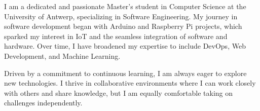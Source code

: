 

\begin{cvparagraph}

I am a dedicated and passionate Master's student in Computer Science at the University of Antwerp, specializing in Software Engineering. 
My journey in software development began with Arduino and Raspberry Pi projects, which sparked my interest in IoT and the seamless integration of software and hardware. Over time, I have broadened my expertise to include DevOps, Web Development, and Machine Learning.

Driven by a commitment to continuous learning, I am always eager to explore new technologies. 
I thrive in collaborative environments where I can work closely with others and share knowledge, but I am equally comfortable taking on challenges independently.
\end{cvparagraph}
